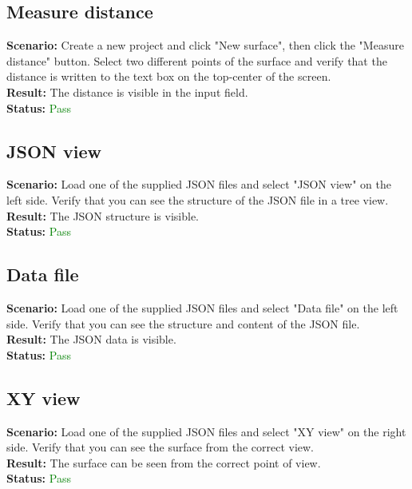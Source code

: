 \documentclass[a4paper, 11pt, article]{report}
\begin{document}
\subsection{Measure distance}

\noindent \textbf{Scenario:} Create a new project and click "New surface", then click the "Measure distance" button. Select two different points of the surface and verify that the distance is written to the text box on the top-center of the screen.
\\
\noindent \textbf{Result:} The distance is visible in the input field.
\\
\noindent \textbf{Status:} \textcolor{green}{Pass}

\subsection{JSON view}

\noindent \textbf{Scenario:} Load one of the supplied JSON files and select "JSON view" on the left side. Verify that you can see the structure of the JSON file in a tree view.
\\
\noindent \textbf{Result:} The JSON structure is visible.
\\
\noindent \textbf{Status:} \textcolor{green}{Pass}

\subsection{Data file}

\noindent \textbf{Scenario:} Load one of the supplied JSON files and select "Data file" on the left side. Verify that you can see the structure and content of the JSON file.
\\
\noindent \textbf{Result:} The JSON data is visible.
\\
\noindent \textbf{Status:} \textcolor{green}{Pass}

\subsection{XY view}

\noindent \textbf{Scenario:} Load one of the supplied JSON files and select "XY view" on the right side. Verify that you can see the surface from the correct view.
\\
\noindent \textbf{Result:} The surface can be seen from the correct point of view.
\\
\noindent \textbf{Status:} \textcolor{green}{Pass}
\end{document}
